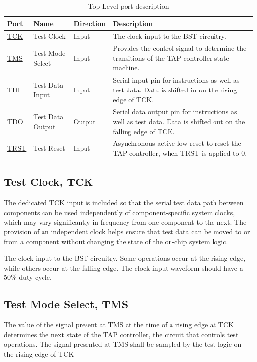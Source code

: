 \vspace{1cm}
\begin{table}[H]
    \caption{Top Level port description}
    \label{tab:top-port}
    \vspace{1cm}
    \begin{tabular}{l l l p{8cm}}

    \hline
         \textbf{Port} & \textbf{Name} & \textbf{Direction} & \textbf{Description}\\ \hline \hline
        \hyperref[subsec:tck]{TCK} & Test Clock & Input & The clock input to the BST circuitry.\\  \hline
        \hyperref[subsec:tms]{TMS} & Test Mode Select & Input & Provides the control signal to determine the transitions of the TAP controller state machine.\\ \hline
        \hyperref[subsec:tdi]{TDI} & Test Data Input & Input & Serial input pin for instructions as well as test data. Data is shifted in on the rising edge of TCK. \\ \hline
        \hyperref[subsec:tdo]{TDO} & Test Data Output & Output & Serial data output pin for instructions as well as test data. Data is shifted out on the falling edge of TCK. \\ \hline
        \hyperref[subsec:trst]{TRST} & Test Reset & Input & Asynchronous active low reset to reset the TAP controller, when TRST is applied to 0.
        \\ \hline
        \end{tabular}
\end{table}
\vspace{0.5cm}

\subsection{Test Clock, TCK}
\label{subsec:tck}
The dedicated TCK input is included so that the serial test data path between components can be used independently of component-specific system clocks, which may vary significantly in frequency from one component to the next. The provision of an independent clock helps ensure that test data can be moved to or from a component without changing the state of the on-chip system logic. 

The clock input to the BST circuitry. Some operations occur at the rising edge, while others occur at the falling edge. The clock input waveform should have a 50\% duty cycle.


\subsection{Test Mode Select, TMS}
\label{subsec:tms}
The value of the signal present at TMS at the time of a rising edge at TCK determines the next state of the TAP controller, the circuit that controls test operations. The signal presented at TMS shall be sampled by the test logic on the rising edge of TCK

